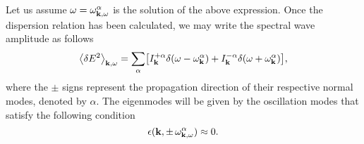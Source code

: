 \documentclass[12pt,a4paper,ruledheader]{report}
\begin{document}
Let us assume $\omega=\omega^{\alpha}_{{\bf k},\omega}$ is the solution
of the above expression. Once the dispersion relation has been calculated,
we may write the spectral wave amplitude as follows
\begin{equation}
\left<\delta E^2\right>_{{\bf k},\omega}
=\sum_{\alpha}\bigl[I^{+\alpha}_{\bf k} \delta(\omega-\omega_{\bf k}^{\alpha})
  +I^{-\alpha}_{\bf k} \delta(\omega+\omega_{\bf k}^{\alpha})\bigr],
\label{wave-dens}
\end{equation}
where the $\pm$ signs represent the propagation direction
of their respective normal modes, denoted by $\alpha$. The
eigenmodes will be given by the oscillation modes that satisfy
the following condition
\begin{equation}
\label{eigenmode}
\epsilon({\bf k,\pm\, \omega_{{\bf k},\omega}^\alpha}) \approx 0.
\end{equation}
\end{document}
